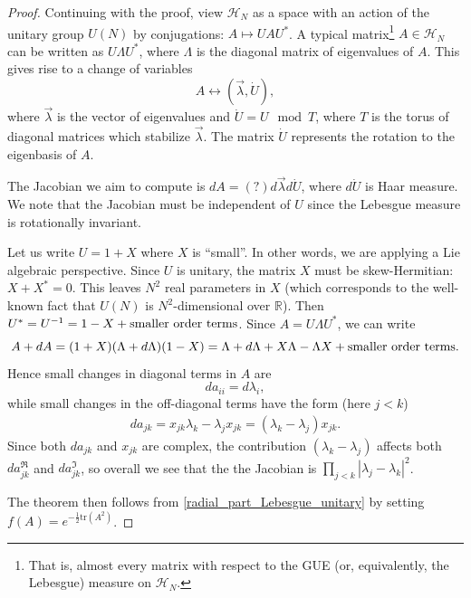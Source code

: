 \documentclass[letterpaper,11pt,oneside,reqno]{amsart}
\numberwithin{equation}{section}
\theoremstyle{definition}
\begin{document}
\begin{proof}
  Continuing with the proof,
  view $\mathcal H_N$ as a space with an action of the unitary group $U(N)$ by conjugations: $A\mapsto UAU^*$. 
  A typical matrix\footnote{That is, almost every matrix with 
  respect to the GUE (or, equivalently, the Lebesgue) measure on $\mathcal H_N$.}
  $A\in \mathcal H_N$ can be written as $U \Lambda U^*$, where $\Lambda$ is the diagonal matrix of eigenvalues of $A$. 
  This gives rise to a change of variables 
  \begin{equation*}
    A \leftrightarrow (\vec{\lambda}, \dot{U}),
  \end{equation*}
  where $\vec{\lambda}$ is the vector of eigenvalues and $\dot{U}=U \mod T$, 
  where $T$ is the torus of diagonal matrices 
  which stabilize $\vec{\lambda}$. The matrix $\dot{U}$ represents the rotation to the eigenbasis of $A$.
  
  The Jacobian we aim to compute is $dA=(?) d\vec{\lambda} d \dot{U}$, where $d\dot{U}$ is Haar measure. 
  We note that the Jacobian must be independent of $U$ since the Lebesgue measure is rotationally invariant.
  
  Let us write $U=1+X$ where $X$ is ``small''. In other words,
  we are applying a Lie algebraic perspective. Since $U$ is unitary, the 
  matrix $X$ must be skew-Hermitian: $X+X^*=0$.
  This leaves $N^{2}$ real parameters in $X$ (which corresponds to the well-known
  fact that $U(N)$ is $N^{2}$-dimensional over $\mathbb{R}$).
  Then $U^*=U^{-1}=1-X+\textnormal{smaller order terms}$. 
  Since $A=U\Lambda U^*$, we can write
  \begin{equation*}
    A+dA=(1+X)(\Lambda+d\Lambda)(1-X)=\Lambda+d\Lambda+X\Lambda-\Lambda X+\textnormal{smaller order terms}.
  \end{equation*}
  Hence small changes in diagonal terms in $A$
  are 
  \begin{equation*}
  	d a_{ii} = d\lambda_i,
  \end{equation*}
  while small changes in the off-diagonal terms have the form (here $j< k$)
  \begin{align*}
    d a_{jk} = x_{jk}\lambda_k-\lambda_j x_{jk}=(\lambda_k-\lambda_j)x_{jk}.
  \end{align*}
  Since both $da_{jk}$ and $x_{jk}$ are complex, the contribution 
  $(\lambda_k-\lambda_j)$ affects both 
  $da_{jk}^{\Re}$ and $da_{jk}^{\Im}$, so overall we see that the 
  the Jacobian is $\prod_{j<k} |\lambda_j-\lambda_k|^2$.
  
  The theorem then follows from \eqref{radial_part_Lebesgue_unitary}
  by setting $f(A)=e^{-\frac{1}{2} \mathrm{tr}(A^2)}$.
\end{proof}
\end{document}
